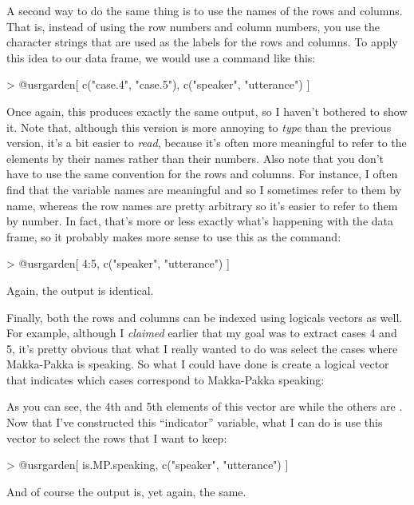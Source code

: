 A second way to do the same thing is to use the names of the rows and columns. That is, instead of using the row numbers and column numbers, you use the character strings that are used as the labels for the rows and columns. To apply this idea to our  data frame, we would use a command like this:
\begin{rblock1}
> @usr{garden[ c("case.4", "case.5"), c("speaker", "utterance") ]}
\end{rblock1}
Once again, this produces exactly the same output, so I haven't bothered to show it. Note that, although this version is more annoying to {\it type} than the previous version, it's a bit easier to {\it read}, because it's often more meaningful to refer to the elements by their names rather than their numbers. Also note that you don't have to use the same convention for the rows and columns. For instance, I often find that the variable names are meaningful and so I sometimes refer to them by name, whereas the row names are pretty arbitrary so it's easier to refer to them by number. In fact, that's more or less exactly what's happening with the  data frame, so it probably makes more sense to use this as the command:
\begin{rblock1}
> @usr{garden[ 4:5, c("speaker", "utterance") ]}
\end{rblock1}
Again, the output is identical.

Finally, both the rows and columns can be indexed using logicals vectors as well. For example, although I {\it claimed} earlier that my goal was to extract cases 4 and 5, it's pretty obvious that what I really wanted to do was select the cases where Makka-Pakka is speaking. So what I could have done is create a logical vector that indicates which cases correspond to Makka-Pakka speaking:
As you can see, the 4th and 5th elements of this vector are  while the others are . Now that I've constructed this ``indicator'' variable, what I can do is use this vector to select the rows that I want to keep:
\begin{rblock1}
> @usr{garden[ is.MP.speaking, c("speaker", "utterance") ]}
\end{rblock1}
And of course the output is, yet again, the same.


